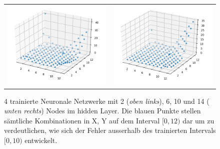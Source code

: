 \begin{figure}
\begin{tabular}{cc}
		\includegraphics[scale=0.4]{learning/img/abs_plot_10_clean.png} &
		\includegraphics[scale=0.4]{learning/img/abs_plot_14_clean.png} \\				
	\end{tabular}
	\label{fig:mst_multiplicator_error}
	\caption{4 trainierte Neuronale Netzwerke mit 2 (\textit{oben links}), 6, 10 und 14 ( \textit{unten rechts}) Nodes im hidden Layer. Die blauen Punkte stellen sämtliche Kombinationen in X, Y auf dem Interval $[0,12)$ dar um zu verdeutlichen, wie sich der Fehler ausserhalb des trainierten Intervals $[0,10)$ entwickelt.}
\end{figure}

